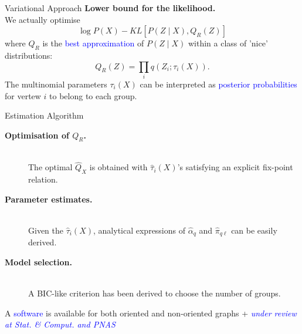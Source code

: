 \documentclass[pdf,mia,noFooter,slideColor,colorBG]{prosper}
\newcommand{\emphase}[1]{{\textcolor{blue}{{#1}}}}
\newcommand{\publi}[1]{{\textcolor{blue}{{\sl \normalsize #1}}}}
\renewcommand{\paragraph}[1]{{\large \bf  #1}}
\begin{document}
\begin{slide}{Variational Approach}
  \paragraph{Lower bound for the likelihood.} \\
  We actually optimise
  $$
  \log P(X) - KL[P(Z\;|\;X), Q_R(Z)]
  $$
  where $Q_R$ is the \emphase{best approximation} of $P(Z\;|\;X)$
  within a class of 'nice' distributions:
  $$
  Q_R(Z) = \prod_i q(Z_i; \tau_i(X)).
  $$
  The multinomial parameters $\tau_i(X)$ can be interpreted as
  \emphase{posterior probabilities} for vertew $i$ to belong to each
  group.
\end{slide}

\begin{slide}{Estimation Algorithm}
  \begin{description}
  \item[\paragraph{Optimisation of $Q_R$.}] ~\\
    The optimal $\widehat{Q}_X$ is obtained with
    $\widehat{\tau}_i(X)$'s satisfying an explicit
    fix-point relation. \\
  \item[\paragraph{Parameter estimates.}] ~\\
    Given the $\widehat{\tau}_i(X)$, analytical expressions of
    $\widehat{\alpha}_q$ and $\widehat{\pi}_{q\ell}$ can be easily derived. \\
  \item[\paragraph{Model selection.}] ~\\
    A BIC-like criterion has been derived to choose the number of
    groups. \\ 
  \end{description}
  A \emphase{software} is available for both oriented and non-oriented
  graphs + \publi{under review at Stat. \& Comput. and PNAS}
\end{slide}
\end{document}
